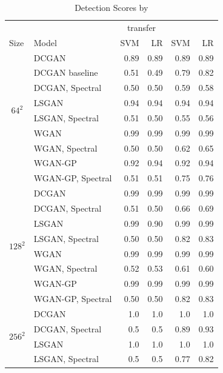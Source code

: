 \documentclass[letterpaper]{article} %
\begin{document}
\iffalse
\begin{table}
    \caption{Detection Scores by \cite{margret2020upconvolution}}
    \centering
    \begin{tabular}{l|l|rr|rr}
        \toprule
        &&\multicolumn{2}{c|}{transfer}&\multicolumn{2}{c}{}\\
        Size & Model &SVM&LR&SVM&LR \\
        \midrule
\multicolumn{1}{c|}{\multirow{8}{*}{$64^2$}} 
& DCGAN & 0.89&0.89& 0.89&0.89\\
& DCGAN baseline & 0.51&0.49& 0.79&0.82\\
 & DCGAN, Spectral &0.50 &0.50 &0.59&0.58\\ 
 \cline{2-6}
 & LSGAN & 0.94 & 0.94& 0.94 & 0.94\\
 & LSGAN, Spectral & 0.51 & 0.50 & 0.55&0.56 \\ \cline{2-6}
 & WGAN & 0.99&0.99&0.99&0.99\\
 & WGAN, Spectral & 0.50&0.50 & 0.62&0.65 \\ \cline{2-6}
 & WGAN-GP & 0.92&0.94&0.92&0.94 \\
 & WGAN-GP, Spectral&0.51&0.51&0.75&0.76\\ \midrule
\multicolumn{1}{c|}{\multirow{8}{*}{$128^2$}} & DCGAN & 0.99 & 0.99 &0.99&0.99 \\
 & DCGAN, Spectral & 0.51&0.50&0.66&0.69 \\ \cline{2-6}
 & LSGAN & 0.99 &0.90&0.99&0.99  \\
 & LSGAN, Spectral &  0.50& 0.50 & 0.82&0.83  \\ \cline{2-6}
 & WGAN & 0.99 & 0.99 & 0.99&0.99 \\
 & WGAN, Spectral & 0.52& 0.53 &0.61 &0.60 \\ \cline{2-6}
 & WGAN-GP &  0.99& 0.99 &   0.99& 0.99 \\ 
 & WGAN-GP, Spectral &  0.50&0.50& 0.82 & 0.83 \\\midrule
\multicolumn{1}{c|}{\multirow{4}{*}{$256^2$}} & DCGAN & 1.0&1.0&1.0&1.0  \\
 & DCGAN, Spectral &  0.5& 0.5 &  0.89&0.93\\ \cline{2-6}
 & LSGAN & 1.0 & 1.0 & 1.0&1.0 \\
 & LSGAN, Spectral &0.5 &0.5  & 0.77&0.82\\ \bottomrule
    \end{tabular}
  
\end{table}
\end{document}

